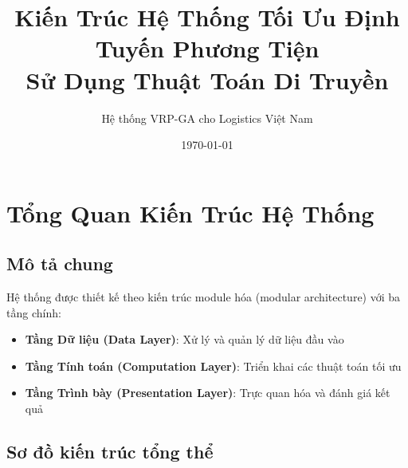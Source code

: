 \documentclass[12pt,a4paper]{article}
\title{\textbf{Kiến Trúc Hệ Thống Tối Ưu Định Tuyến Phương Tiện \\ Sử Dụng Thuật Toán Di Truyền}}
\author{Hệ thống VRP-GA cho Logistics Việt Nam}
\date{\today}
\begin{document}
\maketitle
\tableofcontents
\newpage

\section{Tổng Quan Kiến Trúc Hệ Thống}

\subsection{Mô tả chung}
Hệ thống được thiết kế theo kiến trúc module hóa (modular architecture) với ba tầng chính:
\begin{itemize}
    \item \textbf{Tầng Dữ liệu (Data Layer)}: Xử lý và quản lý dữ liệu đầu vào
    \item \textbf{Tầng Tính toán (Computation Layer)}: Triển khai các thuật toán tối ưu
    \item \textbf{Tầng Trình bày (Presentation Layer)}: Trực quan hóa và đánh giá kết quả
\end{itemize}

\subsection{Sơ đồ kiến trúc tổng thể}
\end{document}
